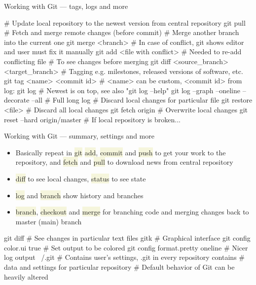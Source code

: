 \documentclass[compress, xelatex, 11pt, xcolor=svgnames, aspectratio=169,
	hyperref={
		bookmarks=true,
		unicode=true,
		colorlinks=true,
		pdftitle={Linux, command line and MetaCentrum},
		plainpages=false,
		pdfauthor={Vojtech Zeisek},
		pdfsubject={Course about use of Linux command line, writing shell scripts and using MetaCentrum of CESNET},
		pdfcreator={XeLaTeX},
		pdfkeywords={Linux, GNU, BASH, shell, command line, MetaCentrum},
		linkcolor=DarkRed, %
		anchorcolor=DarkBlue, %
		citecolor=Indigo, %
		filecolor=NavyBlue, %
		menucolor=DarkMagenta, %
		urlcolor=DarkBlue, %
		},
	url={hyphens, lowtilde} %
	]{beamer}
\renewcommand{\texttt}[1]{\colorbox{Beige}{{\ttfamily #1}}}
\begin{document}
\begin{frame}[fragile]{Working with Git --- tags, logs and more}
	\begin{bashcode}
    # Update local repository to the newest version from central repository
    git pull # Fetch and merge remote changes (before commit)
    # Merge another branch into the current one
    git merge <branch>
    # In case of conflict, git shows editor and user must fix it manually
    git add <file with conflict> # Needed to re-add conflicting file
    # To see changes before merging
    git diff <source_branch> <target_branch>
    # Tagging e.g. milestones, released versions of software, etc.
    git tag <name> <commit id> # <name> can be custom, <commit id> from log:
    git log # Newest is on top, see also "git log --help"
    git log --graph --oneline --decorate --all # Full long log
    # Discard local changes for particular file
    git restore <file>
    # Discard all local changes
    git fetch origin # Overwrite local changes
    git reset --hard origin/master # If local repository is broken...
	\end{bashcode}
\end{frame}

\begin{frame}[fragile]{Working with Git --- summary, settings and more}
	\begin{itemize}
		\item Basically repeat in \texttt{git} \texttt{add}, \texttt{commit} and \texttt{push} to get your work to the repository, and \texttt{fetch} and \texttt{pull} to download news from central repository
		\item \texttt{diff} to see local changes, \texttt{status} to see state
		\item \texttt{log} and \texttt{branch} show history and branches
		\item \texttt{branch}, \texttt{checkout} and \texttt{merge} for branching code and merging changes back to master (main) branch
	\end{itemize}
	\begin{bashcode}
    git diff # See changes in particular text files
    gitk # Graphical interface
    git config color.ui true # Set output to be colored
    git config format.pretty oneline # Nicer log output
    ~/.git # Contains user's settings, .git in every repository contains
           # data and settings for particular repository
           # Default behavior of Git can be heavily altered
	\end{bashcode}
\end{frame}
\end{document}
